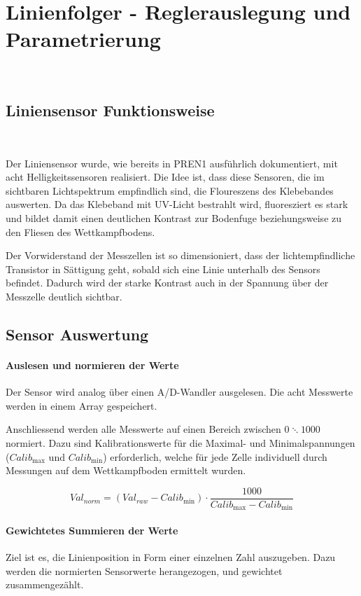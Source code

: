 \documentclass[main.tex]{subfiles} %
\begin{document}

\section{Linienfolger - Reglerauslegung und Parametrierung}~\label{apdx:LineFollowerRegler}

\subsection*{Liniensensor Funktionsweise}~\label{apdx:Liniensensor_auswertung}

Der Liniensensor wurde, wie bereits in PREN1 ausführlich dokumentiert, mit acht
Helligkeitssensoren realisiert. Die Idee ist, dass diese Sensoren, die im
sichtbaren Lichtspektrum empfindlich sind, die Floureszens des Klebebandes
auswerten. Da das Klebeband mit UV-Licht bestrahlt wird, fluoresziert es stark
und bildet damit einen deutlichen Kontrast zur Bodenfuge beziehungsweise zu den
Fliesen des Wettkampfbodens.


Der Vorwiderstand der Messzellen ist so dimensioniert, dass der
lichtempfindliche Transistor in Sättigung geht, sobald sich eine Linie
unterhalb des Sensors befindet. Dadurch wird der starke Kontrast auch in der
Spannung über der Messzelle deutlich sichtbar.

\subsection*{Sensor Auswertung}

\paragraph{Auslesen und normieren der Werte}

Der Sensor wird analog über einen A/D-Wandler ausgelesen. Die acht Messwerte
werden in einem Array gespeichert.

Anschliessend werden alle Messwerte auf einen Bereich zwischen $0 \ddots 1000$
normiert. Dazu sind Kalibrationswerte für die Maximal- und Minimalspannungen
($Calib_{\max}$ und $Calib_{\min}$) erforderlich, welche für jede Zelle
individuell durch Messungen auf dem Wettkampfboden ermittelt wurden.

\[
    Val_{norm} = (Val_{raw} - Calib_{\min}) \cdot \frac{1000}{Calib_{\max} - Calib_{\min}}
\]

\paragraph{Gewichtetes Summieren der Werte}
Ziel ist es, die Linienposition in Form einer einzelnen Zahl auszugeben. Dazu
werden die normierten Sensorwerte herangezogen, und gewichtet zusammengezählt.
\end{document}
